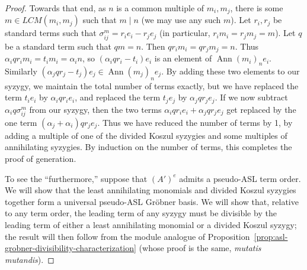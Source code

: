 \documentclass[11pt,reqno]{amsart}
\newcommand{\divides}{\mid}
\DeclareMathOperator{\Ann}{Ann}
\theoremstyle{definition}
\numberwithin{equation}{section}
\begin{document}
\begin{proof}
Towards that end, as $n$ is a common multiple of $m_i, m_j$, there is some $m \in LCM(m_i, m_j)$ such that $m \divides n$ (we may use any such $m$). Let $r_i, r_j$ be standard terms such that $\sigma_{ij}^m = r_i e_i - r_j e_j$ (in particular, $r_i m_i = r_j m_j = m$). Let $q$ be a standard term such that $qm = n$. Then $qr_i m_i = q r_j m_j = n$. Thus $\alpha_i qr_i m_i = t_i m_i = \alpha_i n$, so $(\alpha_i q r_i - t_i) e_i$ is an element of $\Ann(m_i)_n e_i$. Similarly $(\alpha_j q r_j - t_j) e_j \in \Ann(m_j)_n e_j$. By adding these two elements to our syzygy, we maintain the total number of terms exactly, but we have replaced the term $t_i e_i$ by $\alpha_i q r_i e_i$, and replaced the term $t_j e_j$ by $\alpha_j q r_j e_j$. If we now subtract $\alpha_i q \sigma_{ij}^m$ from our syzygy, then the two terms $\alpha_i q r_i e_i + \alpha_j q r_j e_j$ get replaced by the one term $(\alpha_j + \alpha_i) q r_j e_j$. Thus we have reduced the number of terms by 1, by adding a multiple of one of the divided Koszul syzygies and some multiples of annihilating syzygies. By induction on the number of terms, this completes the proof of generation.

To see the ``furthermore,'' suppose that $(A')^e$ admits a pseudo-ASL term order. We will show that the least annihilating monomials and divided Koszul syzygies together form a universal pseudo-ASL Gröbner basis. We will show that, relative to any term order, the leading term of any syzygy must be divisible by the leading term of either a least annihilating monomial or a divided Koszul syzygy; the result will then follow from the module analogue of Proposition~\ref{prop:asl-grobner-divisibility-characterization} (whose proof is the same, \emph{mutatis mutandis}). 


\end{proof}
\end{document}
